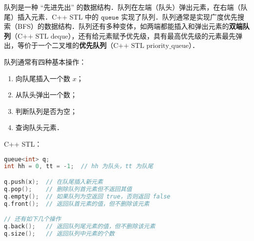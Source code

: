 
队列是一种 “先进先出” 的数据结构．队列在左端（队头）弹出元素，在右端（队尾）插入元素．C++ STL 中的 $\mathtt{queue}$ 实现了队列．队列通常是实现广度优先搜索（BFS）的数据结构．队列还有多种变体，如两端都能插入和弹出元素的\textbf{双端队列}（$\text{C++ STL deque}$），还有给元素赋予优先级，具有最高优先级的元素最先弹出，等价于一个二叉堆的\textbf{优先队列}（$\text{C++ STL priority_queue}$）．

队列通常有四种基本操作：

\begin{enumerate}
\item 向队尾插入一个数 $x$；
\item 从队头弹出一个数；
\item 判断队列是否为空；
\item 查询队头元素．
\end{enumerate}

C++ STL：

\begin{lstlisting}[language=cpp]
queue<int> q;
int hh = 0, tt = -1;  // hh 为队头，tt 为队尾

q.push(x);  // 在队尾插入新元素
q.pop();    // 删除队列首元素但不返回其值
q.empty();  // 如果队列为空返回 true，否则返回 false
q.front();  // 返回队首元素的值，但不删除该元素

// 还有如下几个操作
q.back();   // 返回队列尾元素的值，但不删除该元素
q.size();   // 返回队列中元素的个数

\end{lstlisting}

